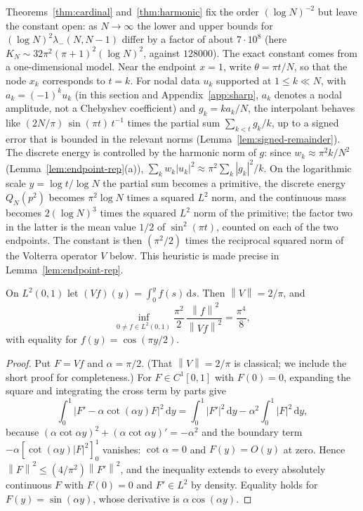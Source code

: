 \documentclass{siamart251216}
\newcommand{\norm}[1]{\left\lVert#1\right\rVert}
\newcommand{\dd}{\,\mathrm d}
\begin{document}
Theorems~\ref{thm:cardinal} and~\ref{thm:harmonic} fix the order
$(\log N)^{-2}$ but leave the constant open: as $N\to\infty$ the lower and
upper bounds for $(\log N)^2\lambda_-(N,N-1)$ differ by a factor of about
$7\cdot10^{8}$ (here $K_N\sim32\pi^2(\pi+1)^2(\log N)^2$, against $128000$).
The exact constant comes from a one-dimensional model. Near the endpoint
$x=1$, write $\theta=\pi t/N$, so that the node $x_k$ corresponds to
$t=k$. For nodal data $u_k$ supported at $1\le k\ll N$, with $a_k=(-1)^ku_k$
(in this section and Appendix~\ref{app:sharp}, $a_k$ denotes a nodal amplitude,
not a Chebyshev coefficient) and $g_k=ka_k/N$, the
interpolant behaves like $(2N/\pi)\,\sin(\pi t)\,t^{-1}$ times the
partial sum $\sum_{k<t}g_k/k$, up to a signed error
that is bounded in the relevant norms (Lemma~\ref{lem:signed-remainder}).
The discrete energy is controlled by the harmonic norm of $g$: since
$w_k\approx\pi^2k/N^2$ (Lemma~\ref{lem:endpoint-rep}(a)),
$\sum_kw_k|u_k|^2\approx\pi^2\sum_k|g_k|^2/k$.
On the logarithmic scale $y=\log t/\log N$ the partial sum becomes a
primitive, the discrete energy $Q_N(p^2)$ becomes $\pi^2\log N$ times a
squared $L^2$ norm, and the continuous mass becomes $2(\log N)^3$ times the
squared $L^2$ norm of the primitive; the factor two in the latter is the mean
value $1/2$ of $\sin^2(\pi t)$, counted on each of the two endpoints. The
constant is then $(\pi^2/2)$ times the reciprocal squared norm of the
Volterra operator $V$ below. This heuristic is made precise in
Lemma~\ref{lem:endpoint-rep}.

\begin{lemma}\label{lem:volterra}%
On $L^2(0,1)$ let $(Vf)(y)=\int_0^yf(s)\dd s$. Then $\norm V=2/\pi$, and
\[
 \inf_{0\ne f\in L^2(0,1)}\frac{\pi^2}2\,\frac{\norm f^2}{\norm{Vf}^2}
 =\frac{\pi^4}8,
\]
with equality for $f(y)=\cos(\pi y/2)$.
\end{lemma}

\begin{proof}
Put $F=Vf$ and $\alpha=\pi/2$. (That $\norm V=2/\pi$ is classical; we include
the short proof for completeness.) For $F\in C^1[0,1]$ with $F(0)=0$,
expanding the square and integrating the cross term by parts give
\[
 \int_0^1|F'-\alpha\cot(\alpha y)F|^2\dd y
 =\int_0^1|F'|^2\dd y-\alpha^2\int_0^1|F|^2\dd y ,
\]
because $(\alpha\cot\alpha y)^2+(\alpha\cot\alpha y)'=-\alpha^2$ and the
boundary term $-\alpha[\cot(\alpha y)|F|^2]_0^1$ vanishes: $\cot\alpha=0$
and $F(y)=O(y)$ at zero. Hence $\norm F^2\le(4/\pi^2)\norm{F'}^2$, and the
inequality extends to every absolutely continuous $F$ with $F(0)=0$ and
$F'\in L^2$ by density. Equality holds for $F(y)=\sin(\alpha y)$, whose
derivative is $\alpha\cos(\alpha y)$.
\end{proof}
\end{document}
